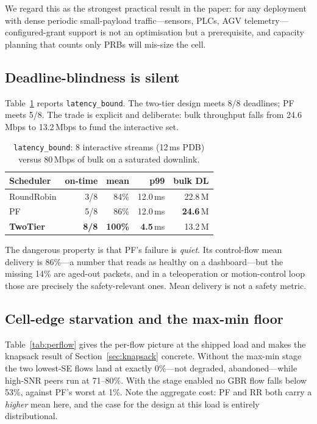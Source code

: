 \documentclass[conference]{IEEEtran}
\begin{document}
We regard this as the strongest practical result in the paper: for any
deployment with dense periodic small-payload traffic---sensors, PLCs, AGV
telemetry---configured-grant support is not an optimisation but a
prerequisite, and capacity planning that counts only PRBs will mis-size the
cell.

\subsection{Deadline-blindness is silent}\label{sec:latency}

Table~\ref{tab:latency} reports \texttt{latency\_bound}. The two-tier
design meets 8/8 deadlines; PF meets 5/8. The trade is explicit and
deliberate: bulk throughput falls from 24.6\,Mbps to 13.2\,Mbps to fund the
interactive set.

\begin{table}[t]
\caption{\texttt{latency\_bound}: 8 interactive streams (12\,ms PDB) versus
80\,Mbps of bulk on a saturated downlink.}
\label{tab:latency}
\centering
\small
\begin{tabular}{@{}lrrrr@{}}
\toprule
Scheduler & on-time & mean & p99 & bulk DL \\
\midrule
RoundRobin  & 3/8 & 84\%  & 12.0\,ms & 22.8\,M \\
PF          & 5/8 & 86\%  & 12.0\,ms & \textbf{24.6}\,M \\
\textbf{TwoTier} & \textbf{8/8} & \textbf{100\%} & \textbf{4.5}\,ms & 13.2\,M \\
\bottomrule
\end{tabular}
\end{table}

The dangerous property is that PF's failure is \emph{quiet}. Its
control-flow mean delivery is 86\%---a number that reads as healthy on a
dashboard---but the missing 14\% are aged-out packets, and in a
teleoperation or motion-control loop those are precisely the
safety-relevant ones. Mean delivery is not a safety metric.

\subsection{Cell-edge starvation and the max-min floor}\label{sec:celledge}

Table~\ref{tab:perflow} gives the per-flow picture at the shipped load and
makes the knapsack result of Section~\ref{sec:knapsack} concrete. Without
the max-min stage the two lowest-SE flows land at exactly $0\%$---not
degraded, abandoned---while high-SNR peers run at 71--80\%. With the stage
enabled no GBR flow falls below 53\%, against PF's worst at 1\%. Note the
aggregate cost: PF and RR both carry a \emph{higher} mean here, and the case
for the design at this load is entirely distributional.
\end{document}

